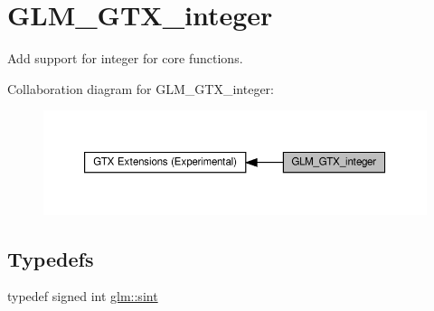 \hypertarget{group__gtx__integer}{}\section{G\+L\+M\+\_\+\+G\+T\+X\+\_\+integer}
\label{group__gtx__integer}


Add support for integer for core functions.  


Collaboration diagram for G\+L\+M\+\_\+\+G\+T\+X\+\_\+integer\+:\nopagebreak
\begin{figure}[H]
\begin{center}
\leavevmode
\includegraphics[width=350pt]{group__gtx__integer}
\end{center}
\end{figure}
\subsection*{Typedefs}
\begin{DoxyCompactItemize}
\item 
typedef signed int \hyperlink{group__gtx__integer_ga73643e09d8c6d362418aec541fdb987d}{glm\+::sint}
\end{DoxyCompactItemize}
